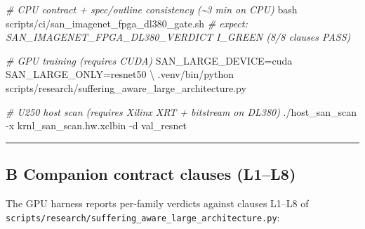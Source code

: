 \documentclass[
]{article}
\newenvironment{Shaded}{}{}
\newcommand{\AttributeTok}[1]{\textcolor[rgb]{0.49,0.56,0.16}{#1}}
\newcommand{\CommentTok}[1]{\textcolor[rgb]{0.38,0.63,0.69}{\textit{#1}}}
\newcommand{\DataTypeTok}[1]{\textcolor[rgb]{0.56,0.13,0.00}{#1}}
\newcommand{\ExtensionTok}[1]{#1}
\newcommand{\FunctionTok}[1]{\textcolor[rgb]{0.02,0.16,0.49}{#1}}
\newcommand{\NormalTok}[1]{#1}
\newcommand{\OperatorTok}[1]{\textcolor[rgb]{0.40,0.40,0.40}{#1}}
\newcommand{\VariableTok}[1]{\textcolor[rgb]{0.10,0.09,0.49}{#1}}
\begin{document}
\begin{Shaded}
\begin{Highlighting}[]
\CommentTok{\# CPU contract + spec/outline consistency (\textasciitilde{}3 min on CPU)}
\FunctionTok{bash}\NormalTok{ scripts/ci/san\_imagenet\_fpga\_dl380\_gate.sh}
\CommentTok{\# expect: SAN\_IMAGENET\_FPGA\_DL380\_VERDICT I\_GREEN (8/8 clauses PASS)}

\CommentTok{\# GPU training (requires CUDA)}
\VariableTok{SAN\_LARGE\_DEVICE}\OperatorTok{=}\NormalTok{cuda }\VariableTok{SAN\_LARGE\_ONLY}\OperatorTok{=}\NormalTok{resnet50 }\DataTypeTok{\textbackslash{}}
  \ExtensionTok{.venv/bin/python}\NormalTok{ scripts/research/suffering\_aware\_large\_architecture.py}

\CommentTok{\# U250 host scan (requires Xilinx XRT + bitstream on DL380)}
\ExtensionTok{./host\_san\_scan} \AttributeTok{{-}x}\NormalTok{ krnl\_san\_scan.hw.xclbin }\AttributeTok{{-}d}\NormalTok{ val\_resnet}
\end{Highlighting}
\end{Shaded}

\begin{center}\rule{0.5\linewidth}{0.5pt}\end{center}

\hypertarget{b-companion-contract-clauses-l1l8}{%
\subsection{B Companion contract clauses
(L1--L8)}\label{b-companion-contract-clauses-l1l8}}

The GPU harness reports per-family verdicts against clauses L1--L8 of
\texttt{scripts/research/suffering\_aware\_large\_architecture.py}:
\end{document}
